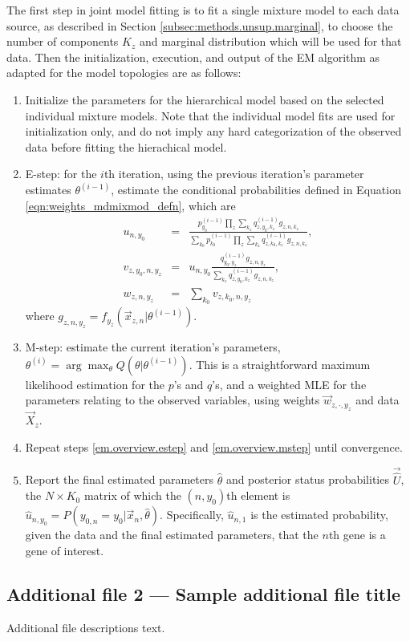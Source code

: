 \documentclass{bmcart}
\begin{document}
\begin{backmatter}
The first step in joint model fitting is to fit a single mixture model to each data source, as described in Section 
\ref{subsec:methods.unsup.marginal}, to choose the number of components $K_z$ and marginal distribution which will be used 
for that data. Then the initialization, execution, and output of the EM algorithm as adapted for the model topologies are as 
follows:
\begin{enumerate}
	\item\label{em.overview.model.selection} Initialize the parameters for the hierarchical model based on the selected individual 
	mixture models.  Note that the individual model fits are used for initialization only, and do not imply any hard categorization of 
	the observed data before fitting the hierachical model.  
	\item\label{em.overview.estep} E-step:  for the $i$th iteration, using the previous iteration's parameter estimates $
	\theta^{(i-1)}$, estimate the conditional probabilities defined in Equation \eqref{eqn:weights_mdmixmod_defn}, which are
	\begin{equation}\label{eqn:layered_uvw}
		\begin{array}{rcl}
			u_{n, y_0} & = & \frac{p_{y_0}^{(i-1)} \prod_z \sum_{k_z} q_{z,y_0,k_z}^{(i-1)} g_{z,n,k_z}}{\sum_{k_0} p_{k_0}^{(i-1)} 
			\prod_z \sum_{k_z} q_{z,k_0,k_z}^{(i-1)} g_{z,n,k_z}}, \\
			v_{z,y_0,n,y_z} & = & u_{n,y_0} \frac{q_{y_0,y_z}^{(i-1)} g_{z,n,y_z}}{\sum_{k_z} q_{z,y_0,k_z}^{(i-1)} g_{z,n,k_z}}, \\
			w_{z,n,y_z} & = & \sum_{k_0} v_{z,k_0,n,y_z}
		\end{array}
	\end{equation}
	where $g_{z,n,y_z} = f_{y_z}(\vec x_{z,n} | \theta^{(i-1)})$.  
	\item\label{em.overview.mstep} 
	M-step:  estimate the current iteration's parameters, $\theta^{(i)} = \arg\max_\theta  Q(\theta |   \theta^{(i-1)})$.  
	This is a straightforward maximum likelihood estimation for the $p$'s and $q$'s, and a weighted MLE for the 
	parameters relating to the observed variables, using weights $\vec w_{z,\cdot,y_z}$ and data $\vec X_z$.
	\item\label{em.overview.iterate} Repeat steps\label{em.overview.iteration} \ref{em.overview.estep} and 
       \ref{em.overview.mstep} until convergence.
	\item\label{em.overview.report} Report the final estimated parameters $\hat\theta$ and posterior status probabilities $
	\vec{\hat U}$, the $N \times K_0$ matrix of which the $(n, y_0)$th element is $\hat u_{n,y_0} = P(y_{0,n} = y_0 | \vec x_n, \hat
	\theta)$.  Specifically, $\hat u_{n,1}$ is the estimated probability, given the data and the final estimated parameters, that the 
	$n$th gene is a gene of interest.
\end{enumerate}

  \subsection*{Additional file 2 --- Sample additional file title}
    Additional file descriptions text.


\end{backmatter}
\end{document}

